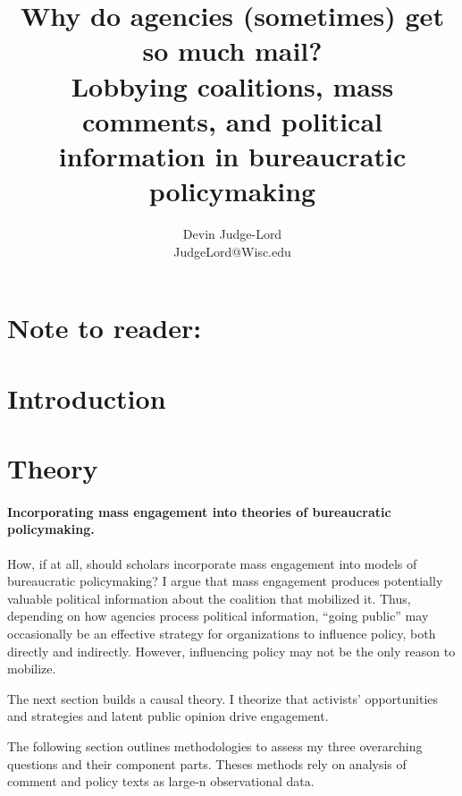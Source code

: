 \documentclass{article}
\title{Why do agencies (sometimes) get so much mail? \\
Lobbying coalitions, mass comments, and political information in bureaucratic policymaking}
\author{Devin Judge-Lord \\ JudgeLord@Wisc.edu}
\begin{document}
\maketitle
\abstract{}


\newpage
\tableofcontents

\newpage
\section*{Note to reader:}


\doublespace
% 

\newpage
\section{Introduction} \label{intro}


\section{Theory} 
\paragraph{Incorporating mass engagement into theories of bureaucratic policymaking.}
How, if at all, should scholars incorporate mass engagement into models of bureaucratic policymaking? 
I argue that mass engagement produces potentially valuable political information about the coalition that mobilized it.
Thus, depending on how agencies process political information, ``going public'' may occasionally be an effective strategy for organizations to influence policy, both directly and indirectly. However, influencing policy may not be the only reason to mobilize. 

The next section builds a causal theory. I theorize that activists' opportunities and strategies and latent public opinion drive engagement.

The following section outlines methodologies to assess my three overarching questions and their component parts. Theses methods rely on analysis of comment and policy texts as large-n observational data. 
\end{document}
